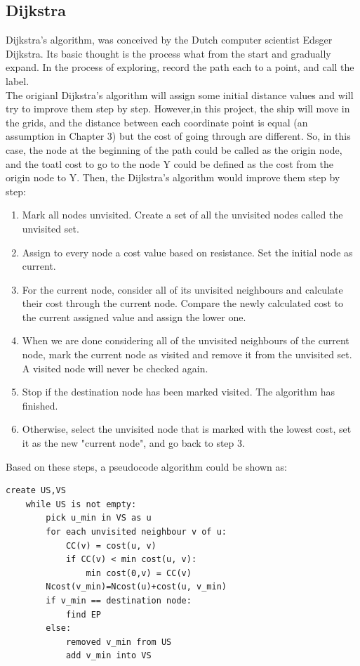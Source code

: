 \subsection{Dijkstra}
Dijkstra's algorithm, was conceived by the Dutch computer scientist Edsger Dijkstra\cite{dijkstra1959note}. Its basic thought is the process what from the start and gradually expand. In the process of exploring, record the path each to a point, and call the label. 
\\The origianl Dijkstra's algorithm will assign some initial distance values and will try to improve them step by step. However,in this project, the ship will move in the grids, and the distance between each coordinate point is equal (an assumption in Chapter 3) but the cost of going through are different. So, in this case, the node at the beginning of the path could be called as the origin node, and the toatl cost to go to the node Y could be defined as the cost from the origin node to Y. Then, the Dijkstra's algorithm would improve them step by step:
\begin{enumerate}[step 1]
    \item Mark all nodes unvisited. Create a set of all the unvisited nodes called the unvisited set.
    \item Assign to every node a cost value based on resistance. Set the initial node as current.
    \item For the current node, consider all of its unvisited neighbours and calculate their cost through the current node. Compare the newly calculated cost to the current assigned value and assign the lower one.
    \item When we are done considering all of the unvisited neighbours of the current node, mark the current node as visited and remove it from the unvisited set. A visited node will never be checked again.
    \item Stop if the destination node has been marked visited. The algorithm has finished.
    \item Otherwise, select the unvisited node that is marked with the lowest cost, set it as the new "current node", and go back to step 3.
\end{enumerate}
Based on these steps, a pseudocode algorithm could be shown as:
\begin{lstlisting}[caption= Pseudocode Dijkstra algorithm,label=Dijkstra]
    create US,VS
    while US is not empty:
        pick u_min in VS as u
        for each unvisited neighbour v of u:
            CC(v) = cost(u, v)
            if CC(v) < min cost(u, v):
                min cost(0,v) = CC(v)
        Ncost(v_min)=Ncost(u)+cost(u, v_min)
        if v_min == destination node:
            find EP
        else:
            removed v_min from US
            add v_min into VS
\end{lstlisting}
